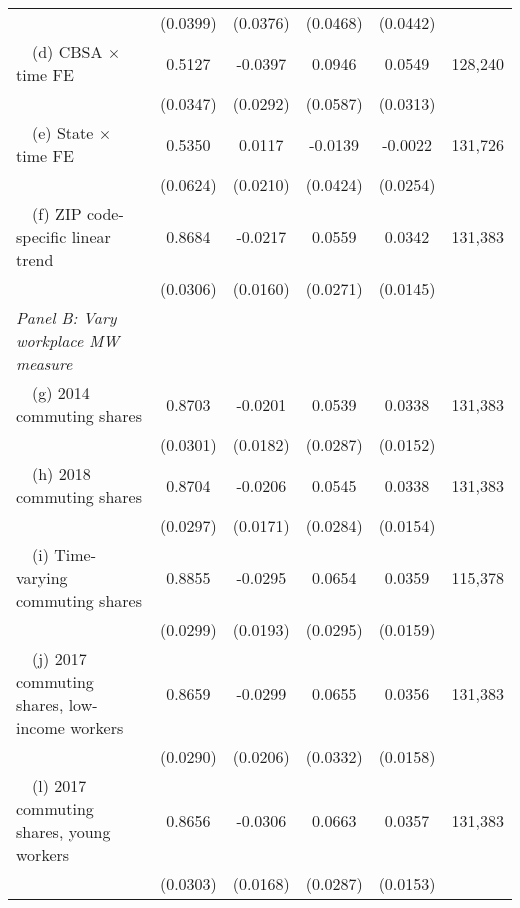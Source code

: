 \begin{landscape}
\begin{table}[ht!]
\begin{tabular}{@{}lccccc@{}}
                                                             & (0.0399) & (0.0376) & (0.0468) & (0.0442) &      \\
        $\quad$(d) CBSA $\times$ time FE                     &  0.5127  &  -0.0397  &  0.0946  &  0.0549  & 128,240 \\
                                                             & (0.0347) & (0.0292) & (0.0587) & (0.0313) &      \\
        $\quad$(e) State $\times$ time FE                    &  0.5350  &  0.0117  &  -0.0139  &  -0.0022  & 131,726 \\
                                                             & (0.0624) & (0.0210) & (0.0424) & (0.0254) &      \\
        $\quad$(f) ZIP code-specific linear trend            &  0.8684  &  -0.0217  &  0.0559  &  0.0342  & 131,383 \\
                                                             & (0.0306) & (0.0160) & (0.0271) & (0.0145) &      \\
        \textit{Panel B: Vary workplace MW measure}          &       &       &       &       &      \\
        $\quad$(g) 2014 commuting shares                     &  0.8703  &  -0.0201  &  0.0539  &  0.0338  & 131,383 \\
                                                             & (0.0301) & (0.0182) & (0.0287) & (0.0152) &      \\
        $\quad$(h) 2018 commuting shares                     &  0.8704  &  -0.0206  &  0.0545  &  0.0338  & 131,383 \\
                                                             & (0.0297) & (0.0171) & (0.0284) & (0.0154) &      \\
        $\quad$(i) Time-varying commuting shares             &  0.8855  &  -0.0295  &  0.0654  &  0.0359  & 115,378 \\
                                                             & (0.0299) & (0.0193) & (0.0295) & (0.0159) &      \\
        $\quad$(j) 2017 commuting shares, low-income workers &  0.8659  &  -0.0299  &  0.0655  &  0.0356  & 131,383 \\
                                                             & (0.0290) & (0.0206) & (0.0332) & (0.0158) &      \\
        $\quad$(l) 2017 commuting shares, young workers      &  0.8656  &  -0.0306  &  0.0663  &  0.0357  & 131,383 \\
                                                             & (0.0303) & (0.0168) & (0.0287) & (0.0153) &      \\ \bottomrule
    \end{tabular}


\end{table}
\end{landscape}
